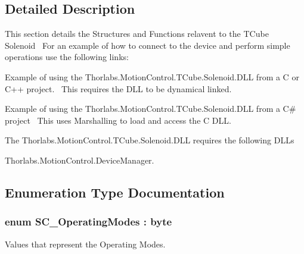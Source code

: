 \subsection{Detailed Description}
This section details the Structures and Functions relavent to the T\+Cube Solenoid~\newline
 For an example of how to connect to the device and perform simple operations use the following links\+: 
\begin{DoxyItemize}
\item Example of using the Thorlabs.Motion\+Control.T\+Cube.Solenoid.D\+LL from a C or C++ project.~\newline
 This requires the D\+LL to be dynamical linked.  
\item Example of using the Thorlabs.Motion\+Control.T\+Cube.Solenoid.D\+LL from a C\# project~\newline
 This uses Marshalling to load and access the C D\+LL.  
\end{DoxyItemize}The Thorlabs.\+Motion\+Control.\+T\+Cube.\+Solenoid.\+D\+LL requires the following D\+L\+Ls 
\begin{DoxyItemize}
\item Thorlabs.\+Motion\+Control.\+Device\+Manager.  
\end{DoxyItemize}

\subsection{Enumeration Type Documentation}
\subsubsection[{\texorpdfstring{S\+C\+\_\+\+Operating\+Modes}{SC_OperatingModes}}]{\setlength{\rightskip}{0pt plus 5cm}enum {\bf S\+C\+\_\+\+Operating\+Modes} \+: byte}\hypertarget{group___t_cube_solenoid_ga02b53b0f5b45f74b6b2da24cc6ff2895}{}\label{group___t_cube_solenoid_ga02b53b0f5b45f74b6b2da24cc6ff2895}


Values that represent the Operating Modes. 

